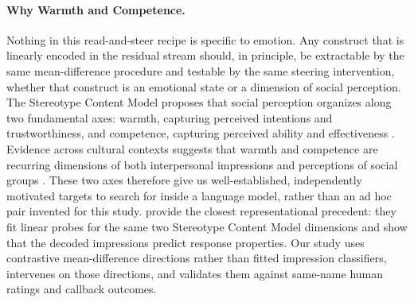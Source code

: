 \documentclass[twocolumn]{article}
\begin{document}
\paragraph{Why Warmth and Competence.}
Nothing in this read-and-steer recipe is specific to emotion.
Any construct that is linearly encoded in the residual stream should, in
principle, be extractable by the same mean-difference procedure and
testable by the same steering intervention, whether that construct is an
emotional state or a dimension of social perception.
The Stereotype Content Model proposes that social perception organizes along
two fundamental axes: warmth, capturing perceived intentions and
trustworthiness, and competence, capturing perceived ability and
effectiveness \citep{fiske2002model}.
Evidence across cultural contexts suggests that warmth and competence are
recurring dimensions of both interpersonal impressions and perceptions of
social groups \citep{fiske2007universal, cuddy2008warmth}.
These two axes therefore give us well-established, independently motivated
targets to search for inside a language model, rather than an ad hoc pair
invented for this study.
\citet{deas2025artificial} provide the closest representational precedent:
they fit linear probes for the same two Stereotype Content Model dimensions
and show that the decoded impressions predict response properties. Our study
uses contrastive mean-difference directions rather than fitted impression
classifiers, intervenes on those directions, and validates them against
same-name human ratings and callback outcomes.
\end{document}
